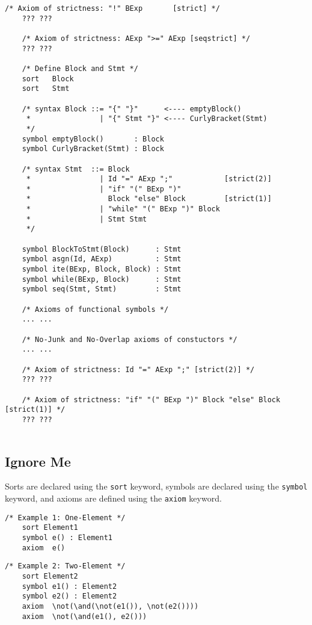 \documentclass[UTF8,11pt]{article}
\theoremstyle{plain}
\theoremstyle{definition}
\theoremstyle{remark}
\begin{document}
\begin{Verbatim}[fontsize=\small]
    /* Axiom of strictness: "!" BExp       [strict] */
    ??? ???
    
    /* Axiom of strictness: AExp ">=" AExp [seqstrict] */
    ??? ???
    
    /* Define Block and Stmt */
    sort   Block
    sort   Stmt
    
    /* syntax Block ::= "{" "}"      <---- emptyBlock()
     *                | "{" Stmt "}" <---- CurlyBracket(Stmt)
     */
    symbol emptyBlock()       : Block
    symbol CurlyBracket(Stmt) : Block
    
    /* syntax Stmt  ::= Block
     *                | Id "=" AExp ";"            [strict(2)]
     *                | "if" "(" BExp ")"
     *                  Block "else" Block         [strict(1)]
     *                | "while" "(" BExp ")" Block
     *                | Stmt Stmt
     */
     
    symbol BlockToStmt(Block)      : Stmt
    symbol asgn(Id, AExp)          : Stmt
    symbol ite(BExp, Block, Block) : Stmt
    symbol while(BExp, Block)      : Stmt
    symbol seq(Stmt, Stmt)         : Stmt
    
    /* Axioms of functional symbols */
    ... ...
    
    /* No-Junk and No-Overlap axioms of constuctors */
    ... ...
    
    /* Axiom of strictness: Id "=" AExp ";" [strict(2)] */
    ??? ???
    
    /* Axiom of strictness: "if" "(" BExp ")" Block "else" Block [strict(1)] */
    ??? ???
    
\end{Verbatim}

\subsection{Ignore Me}

\newcommand{\smalltt}[1]{\texttt{\small #1} }
\newcommand{\sort}{\smalltt{sort}}
\newcommand{\symb}{\smalltt{symbol}}
\newcommand{\axiom}{\smalltt{axiom}}

Sorts are declared using the \sort keyword, symbols are declared using the \symb keyword, and axioms are defined using the \axiom keyword.

\begin{Verbatim}[fontsize=\small]
    /* Example 1: One-Element */
    sort Element1
    symbol e() : Element1
    axiom  e()
\end{Verbatim}

\begin{Verbatim}[fontsize=\small]
    /* Example 2: Two-Element */
    sort Element2
    symbol e1() : Element2
    symbol e2() : Element2
    axiom  \not(\and(\not(e1()), \not(e2())))
    axiom  \not(\and(e1(), e2()))
\end{Verbatim}
\end{document}

